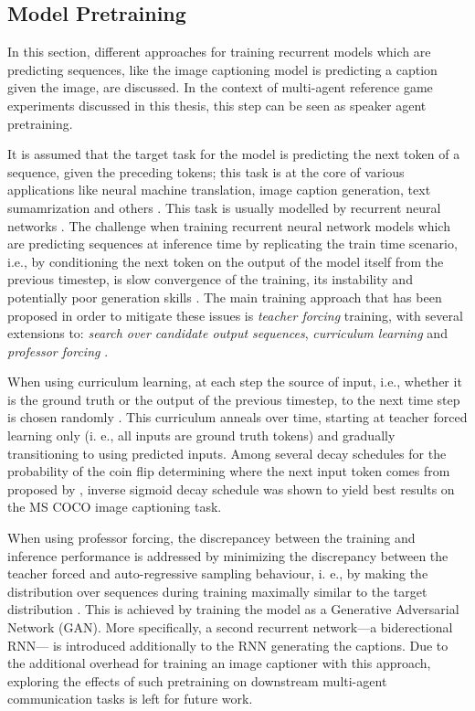 \subsection{Model Pretraining}
\label{model_pretraining}
In this section, different approaches for training recurrent models which are predicting sequences, like the image captioning model is predicting a caption given the image, are discussed. In the context of multi-agent reference game experiments discussed in this thesis, this step can be seen as speaker agent pretraining.

It is assumed that the target task for the model is predicting the next token of a sequence, given the preceding tokens; this task is at the core of various applications like neural machine translation, image caption generation, text sumamrization and others \parencite[e.g.,][]{cho2014learning, sutskever2014sequence}. This task is usually modelled by recurrent neural networks \parencite{rumelhart1986learning}. The challenge when training recurrent neural network models which are predicting sequences at inference time by replicating the train time scenario, i.e., by conditioning the next token on the output of the model itself from the previous timestep, is slow convergence of the training, its instability and potentially poor generation skills \parencite{lamb2016professor}. The main training approach that has been proposed in order to mitigate these issues is \textit{teacher forcing} training, with several extensions to: \textit{search over candidate output sequences}, \textit{curriculum learning} and \textit{professor forcing} \parencite{goodfellow2016deep, williams1989algorithm}.

When using curriculum learning, at each step the source of input, i.e., whether it is the ground truth or the output of the previous timestep, to the next time step is chosen randomly \parencite{bengio2015scheduled}. This curriculum anneals over time, starting at teacher forced learning only (i. e., all inputs are ground truth tokens) and gradually transitioning to using predicted inputs. Among several decay schedules for the probability of the coin flip determining where the next input token comes from proposed by \cite{bengio2015scheduled}, inverse sigmoid decay schedule  was shown to yield best results on the MS COCO image captioning task.

When using professor forcing, the discrepancey between the training and inference performance is addressed by minimizing the discrepancy between the teacher forced and auto-regressive sampling behaviour, i. e., by making the distribution over sequences during training maximally similar to the target distribution \parencite{lamb2016professor}. This is achieved by training the model as a Generative Adversarial Network (GAN). More specifically, a second recurrent network---a biderectional RNN---  is introduced additionally to the RNN generating the captions. Due to the additional overhead for training an image captioner with this approach, exploring the effects of such pretraining on downstream multi-agent communication tasks is left for future work.

